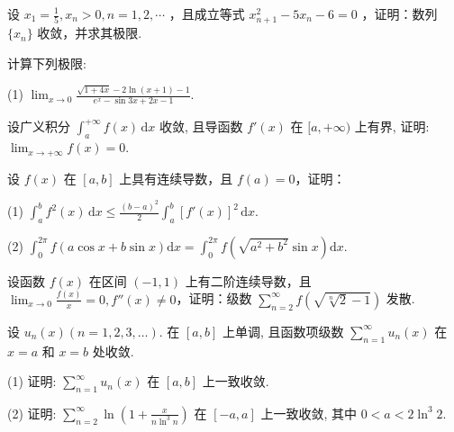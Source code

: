 设  $x_{1}=\frac{1}{5}, x_{n}>0, n=1,2,\cdots$ ，且成立等式  $x_{n+1}^{2}-5x_{n}-6=0$ ，证明：数列  $\{x_{n}\}$  收敛，并求其极限.\par
计算下列极限:\par
\par{}
(1) $\lim_{x\to 0}\frac{\sqrt{1 + 4x} - 2\ln(x + 1) - 1}{e^x - \sin 3x + 2x - 1}.$\par
\nopagebreak[4]
设广义积分 $\int_{a}^{+\infty} f(x) \, \mathrm{d}x$ 收敛, 且导函数 $f'(x)$ 在 $[a, +\infty)$ 上有界, 证明: $\lim_{x \to +\infty} f(x) = 0$.\par
设 $f(x)$ 在 $[a, b]$ 上具有连续导数，且 $f(a) = 0$，证明：\par
(1) $\int_{a}^{b} f^{2}(x) \, \mathrm{d}x \leq \frac{(b - a)^{2}}{2} \int_{a}^{b} [f'(x)]^{2} \, \mathrm{d}x.$\par
(2) $\int_0^{2\pi}f(a\cos x + b\sin x)\mathrm{d}x = \int_0^{2\pi}f(\sqrt{a^2 + b^2}\sin x)\mathrm{d}x.$\par
设函数 $f(x)$ 在区间 $(-1, 1)$ 上有二阶连续导数，且 $\lim_{x \to 0} \frac{f(x)}{x} = 0, f''(x) \neq 0$，证明：级数 $\sum_{n=2}^{\infty} f\left(\sqrt{\sqrt[n]{2} - 1}\right)$ 发散.\par
设 $u_{n}(x) (n = 1,2,3,\dots)$. 在 $[a,b]$ 上单调, 且函数项级数 $\sum_{n=1}^{\infty} u_{n}(x)$ 在 $x = a$ 和 $x = b$ 处收敛.\par
(1) 证明: $\sum_{n=1}^{\infty} u_n(x)$ 在 $[a, b]$ 上一致收敛.\par
(2) 证明: $\sum_{n=2}^{\infty} \ln \left(1 + \frac{x}{n \ln^{3} n}\right)$ 在 $[-a, a]$ 上一致收敛, 其中 $0 < a < 2 \ln^{3} 2$.\par
